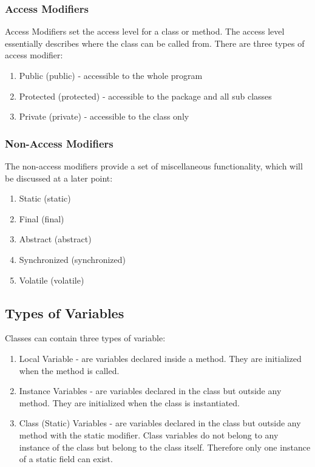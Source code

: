 \documentclass[a4paper]{article}
\begin{document}
\subsubsection*{Access Modifiers}

Access Modifiers set the access level for a class or method. The access level essentially describes where the class can be called from. There are three types of access modifier:

\begin{enumerate}

\item Public (public) - accessible to the whole program
\item Protected (protected) - accessible to the package and all sub classes
\item Private (private) - accessible to the class only 

\end{enumerate}

\subsubsection*{Non-Access Modifiers}
The non-access modifiers provide a set of miscellaneous functionality, which will be discussed at a later point:

\begin{enumerate}
\item Static (static)
\item Final (final)
\item Abstract (abstract)
\item Synchronized (synchronized)
\item Volatile (volatile)
\end{enumerate}


\subsection*{Types of Variables}
Classes can contain three types of variable:

\begin{enumerate}

\item Local Variable - are variables declared inside a method. They are initialized when the method is called.
\item Instance Variables - are variables declared in the class but outside any method. They are initialized when the class is instantiated.
\item Class (Static) Variables -  are variables declared in the class but outside any method with the static modifier. Class variables do not belong to any instance of the class but belong to the class itself. Therefore only one instance of a static field can exist.

\end{enumerate}
\end{document}
